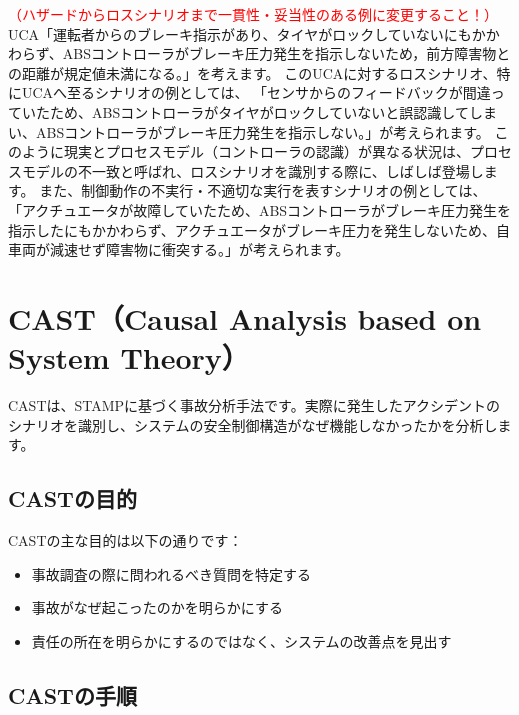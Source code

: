 \textcolor{red}{（ハザードからロスシナリオまで一貫性・妥当性のある例に変更すること！）}
UCA「運転者からのブレーキ指示があり、タイヤがロックしていないにもかかわらず、ABSコントローラがブレーキ圧力発生を指示しないため，前方障害物との距離が規定値未満になる。」を考えます。
このUCAに対するロスシナリオ、特にUCAへ至るシナリオの例としては、
「センサからのフィードバックが間違っていたため、ABSコントローラがタイヤがロックしていないと誤認識してしまい、ABSコントローラがブレーキ圧力発生を指示しない。」が考えられます。
このように現実とプロセスモデル（コントローラの認識）が異なる状況は、プロセスモデルの不一致と呼ばれ、ロスシナリオを識別する際に、しばしば登場します。
また、制御動作の不実行・不適切な実行を表すシナリオの例としては、
「アクチュエータが故障していたため、ABSコントローラがブレーキ圧力発生を指示したにもかかわらず、アクチュエータがブレーキ圧力を発生しないため、自車両が減速せず障害物に衝突する。」が考えられます。



\section{CAST（Causal Analysis based on System Theory）}

CASTは、STAMPに基づく事故分析手法です。実際に発生したアクシデントのシナリオを識別し、システムの安全制御構造がなぜ機能しなかったかを分析します。

\subsection{CASTの目的}

CASTの主な目的は以下の通りです：

\begin{itemize}
    \item 事故調査の際に問われるべき質問を特定する
    \item 事故がなぜ起こったのかを明らかにする
    \item 責任の所在を明らかにするのではなく、システムの改善点を見出す
\end{itemize}

\subsection{CASTの手順}

